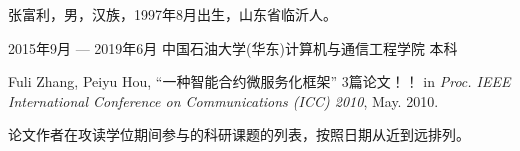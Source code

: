 \documentclass[macfonts,master,oneside]{njuthesis}
\begin{document}
\backmatter
\begin{resume}
  \begin{authorinfo}
    \noindent 张富利，男，汉族，1997年8月出生，山东省临沂人。
  \end{authorinfo}
  \begin{education}
    \item[2015年9月 --- 2019年6月] 中国石油大学(华东)计算机与通信工程学院 \hfill 本科
  \end{education}
  \begin{publications}
    \item Fuli Zhang, Peiyu Hou,  ``一种智能合约微服务化框架''
    3篇论文！！ 
    in \textsl{Proc. IEEE International Conference on Communications (ICC) 2010}, May. 2010.
    \item  论文作者在攻读学位期间参与的科研课题的列表，按照日期从近到远排列。
  \end{publications}
 

  \end{resume}


\end{document}
